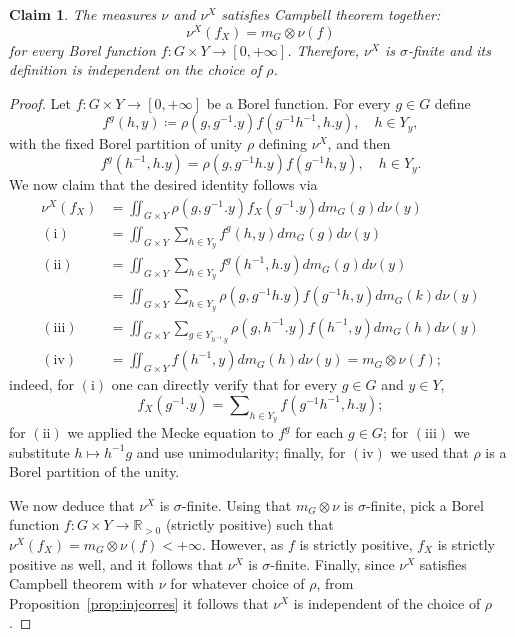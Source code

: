 \documentclass{amsart}
\numberwithin{equation}{subsection}
\newtheorem{claim}[thm]{Claim}
\theoremstyle{remark}
\begin{document}
\begin{claim}\label{clm:campbcorr}
The measures \(\nu\) and \(\nu^{X}\) satisfies Campbell theorem together:
\[\nu^{X}\left(f_{X}\right)=m_{G}\otimes\nu\left(f\right)\]
for every Borel function \(f:G\times Y\to\left[0,+\infty\right]\). Therefore, \(\nu^{X}\) is \(\sigma\)-finite and its definition is independent on the choice of \(\rho\).
\end{claim}

\begin{proof}
Let \(f:G\times Y\to\left[0,+\infty\right]\) be a Borel function. For every \(g\in G\) define
\[f^{g}\left(h,y\right)\coloneqq \rho\left(g,g^{-1}.y\right)f\left(g^{-1}h^{-1},h.y\right),\quad h\in Y_{y},\]
with the fixed Borel partition of unity \(\rho\) defining \(\nu^{X}\), and then
\[f^{g}\left(h^{-1},h.y\right)=\rho\left(g,g^{-1}h.y\right)f\left(g^{-1}h,y\right),\quad h\in Y_{y}.\]
We now claim that the desired identity follows via
\begin{align*}
\nu^{X}\left(f_{X}\right)
&=\iint\nolimits_{G\times Y}\rho\left(g,g^{-1}.y\right)f_{X}\left(g^{-1}.y\right)dm_{G}\left(g\right)d\nu\left(y\right)\\
\left(\mathrm{i}\right)&=\iint\nolimits_{G\times Y}\sum\nolimits_{h\in Y_{y}}f^{g}\left(h,y\right)dm_{G}\left(g\right)d\nu\left(y\right)\\
\left(\mathrm{ii}\right)&=\iint\nolimits_{G\times Y}\sum\nolimits_{h\in Y_{y}}f^{g}\left(h^{-1},h.y\right)dm_{G}\left(g\right)d\nu\left(y\right)\\
&=\iint\nolimits_{G\times Y}\sum\nolimits_{h\in Y_{y}}\rho\left(g,g^{-1}h.y\right)f\left(g^{-1}h,y\right)dm_{G}\left(k\right)d\nu\left(y\right)\\
\left(\mathrm{iii}\right)&=\iint\nolimits_{G\times Y}\sum\nolimits_{g\in Y_{h^{-1}.y}}\rho\left(g,h^{-1}.y\right)f\left(h^{-1},y\right)dm_{G}\left(h\right)d\nu\left(y\right)\\
\left(\mathrm{iv}\right)&=\iint\nolimits_{G\times Y}f\left(h^{-1},y\right)dm_{G}\left(h\right)d\nu\left(y\right)=m_{G}\otimes\nu\left(f\right);
\end{align*}
indeed, for \(\left(\mathrm{i}\right)\) one can directly verify that for every \(g\in G\) and \(y\in Y\),
\[f_{X}\left(g^{-1}.y\right)=\sum\nolimits_{h\in Y_{y}}f\left(g^{-1}h^{-1},h.y\right);\]
for \(\left(\mathrm{ii}\right)\) we applied the Mecke equation to \(f^{g}\) for each \(g\in G\); for \(\left(\mathrm{iii}\right)\) we substitute \(h\mapsto h^{-1}g\) and use unimodularity; finally, for \(\left(\mathrm{iv}\right)\) we used that \(\rho\) is a Borel partition of the unity.

We now deduce that \(\nu^{X}\) is \(\sigma\)-finite. Using that \(m_{G}\otimes\nu\) is \(\sigma\)-finite, pick a Borel function \(f:G\times Y\to\mathbb{R}_{>0}\) (strictly positive) such that \(\nu^{X}\left(f_{X}\right)=m_{G}\otimes\nu\left(f\right)<+\infty\). However, as \(f\) is strictly positive, \(f_{X}\) is strictly positive as well, and it follows that \(\nu^{X}\) is \(\sigma\)-finite. Finally, since \(\nu^{X}\) satisfies Campbell theorem with \(\nu\) for whatever choice of \(\rho\), from Proposition~\ref{prop:injcorres} it follows that \(\nu^{X}\) is independent of the choice of \(\rho\).
\end{proof}
\end{document}
